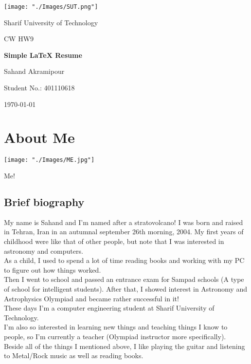 \documentclass[12pt,a4paper]{report}
\begin{document}
\begin{titlepage}
	\centering
	\texttt{[image: "./Images/SUT.png"]}\par\vspace{1cm}
	{Sharif University of Technology \par}
	\vspace{1cm}
	{\scshape\Large CW HW9\par}
	\vspace{1.5cm}
	{\huge\bfseries Simple \LaTeX{} Resume\par}
	\vspace{2cm}
	{\Large Sahand Akramipour\par}
	\vspace{1cm}
	{\Large Student No.: 401110618\par}
	\vfill

	\vfill
	{\large \today\par}
\end{titlepage}

\tableofcontents

\chapter{About Me}
\begin{centering}
\texttt{[image: "./Images/ME.jpg"]}\par\vspace{0.2cm}
	{Me! \par}
\end{centering}
\section{Brief biography}
My name is Sahand and I'm named after a stratovolcano! I was born and raised in Tehran, Iran in an autumnal september 26th morning, 2004. My first years of childhood were like that of other people, but note that I was interested in astronomy and computers.\\
As a child, I used to spend a lot of time reading books and working with my PC to figure out how things worked.\\
Then I went to school and passed an entrance exam for Sampad schools (A type of school for intelligent students). After that, I showed interest in Astronomy and Astrophysics Olympiad and became rather successful in it!\\
These days I'm a computer engineering student at Sharif University of Technology.\\
I'm also so interested in learning new things and teaching things I know to people, so I'm currently a teacher (Olympiad instructor more specifically).\\
Beside all of the things I mentioned above, I like playing the guitar and listening to Metal/Rock music as well as reading books.
\end{document}
